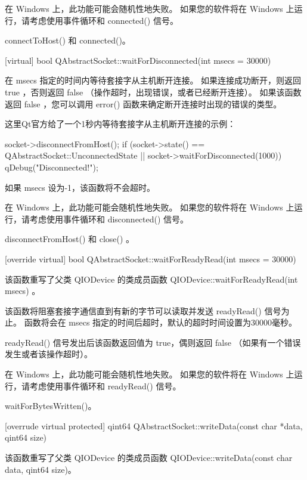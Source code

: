 \begin{notice}
在 Windows 上，此功能可能会随机性地失败。 如果您的软件将在 Windows 上运行，请考虑使用事件循环和 connected() 信号。
\end{notice}



\begin{seeAlso}
connectToHost() 和 connected()。
\end{seeAlso}

\splitLine

[virtual] bool QAbstractSocket::waitForDisconnected(int msecs = 30000)

在 msecs 指定的时间内等待套接字从主机断开连接。 如果连接成功断开，则返回 true ，否则返回 false （操作超时，出现错误，或者已经断开连接）。 如果该函数返回 false ，您可以调用 error() 函数来确定断开连接时出现的错误的类型。

这里Qt官方给了一个1秒内等待套接字从主机断开连接的示例：

\begin{cppcode}
socket->disconnectFromHost();
if (socket->state() == QAbstractSocket::UnconnectedState
	|| socket->waitForDisconnected(1000)) {
		qDebug("Disconnected!");
 }
\end{cppcode}

如果 msecs 设为-1，该函数将不会超时。

\begin{notice}
在 Windows 上，此功能可能会随机性地失败。 如果您的软件将在 Windows 上运行，请考虑使用事件循环和 disconnected() 信号。
\end{notice}




\begin{seeAlso}
disconnectFromHost() 和 close() 。
\end{seeAlso}

\splitLine

[override virtual] bool QAbstractSocket::waitForReadyRead(int msecs =
30000)

该函数重写了父类 QIODevice 的类成员函数 QIODevice::waitForReadyRead(int msecs) 。

该函数将阻塞套接字通信直到有新的字节可以读取并发送 readyRead() 信号为止。 函数将会在 msecs 指定的时间后超时，默认的超时时间设置为30000毫秒。

readyRead() 信号发出后该函数返回值为 true，偶则返回 false （如果有一个错误发生或者该操作超时）。

\begin{notice}
在 Windows 上，此功能可能会随机性地失败。 如果您的软件将在 Windows 上运行，请考虑使用事件循环和 readyRead() 信号。
\end{notice}


\begin{seeAlso}
waitForBytesWritten()。
\end{seeAlso}


\splitLine

[overrude virtual protected] qint64 QAbstractSocket::writeData(const char *data, qint64 size)

该函数重写了父类 QIODevice 的类成员函数 QIODevice::writeData(const
char data, qint64 size)。
